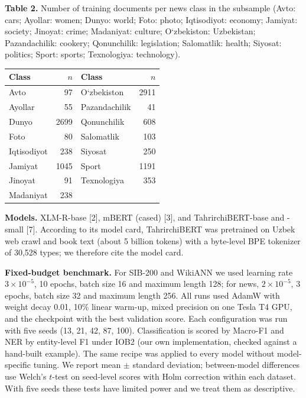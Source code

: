 \documentclass[11pt]{book}
\begin{document}
\begin{center}
\textbf{Table 2.} Number of training documents per news class in the subsample (Avto: cars; Ayollar: women; Dunyo: world; Foto: photo; Iqtisodiyot: economy; Jamiyat: society; Jinoyat: crime; Madaniyat: culture; O\textquoteleft zbekiston: Uzbekistan; Pazandachilik: cookery; Qonunchilik: legislation; Salomatlik: health; Siyosat: politics; Sport: sports; Texnologiya: technology).\\[2pt]
\begin{tabular}{lrlr}
\hline
Class & $n$ & Class & $n$ \\
\hline
Avto & 97 & O\textquoteleft zbekiston & 2911 \\
Ayollar & 55 & Pazandachilik & 41 \\
Dunyo & 2699 & Qonunchilik & 608 \\
Foto & 80 & Salomatlik & 103 \\
Iqtisodiyot & 238 & Siyosat & 250 \\
Jamiyat & 1045 & Sport & 1191 \\
Jinoyat & 91 & Texnologiya & 353 \\
Madaniyat & 238 &  &  \\
\hline
\end{tabular}
\end{center}

\textbf{Models.} XLM-R-base [2], mBERT (cased) [3], and TahrirchiBERT-base and -small [7]. According to its model card, TahrirchiBERT was pretrained on Uzbek web crawl and book text (about 5 billion tokens) with a byte-level BPE tokenizer of 30,528 types; we therefore cite the model card.

\textbf{Fixed-budget benchmark.} For SIB-200 and WikiANN we used learning rate $3\times10^{-5}$, 10 epochs, batch size 16 and maximum length 128; for news, $2\times10^{-5}$, 3 epochs, batch size 32 and maximum length 256. All runs used AdamW with weight decay 0.01, 10\% linear warm-up, mixed precision on one Tesla T4 GPU, and the checkpoint with the best validation score. Each configuration was run with five seeds (13, 21, 42, 87, 100). Classification is scored by Macro-F1 and NER by entity-level F1 under IOB2 (our own implementation, checked against a hand-built example). The same recipe was applied to every model without model-specific tuning. We report mean $\pm$ standard deviation; between-model differences use Welch's $t$-test on seed-level scores with Holm correction within each dataset. With five seeds these tests have limited power and we treat them as descriptive.
\end{document}

